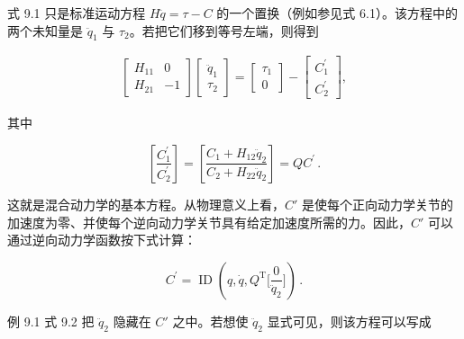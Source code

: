 \documentclass[10pt,a4paper]{book}
\theoremstyle{thmstyle} %
\theoremstyle{defstyle} %
\theoremstyle{prostyle} %
\begin{document}
式 9.1 只是标准运动方程 $H\ddot{q}=\tau-C$ 的一个置换（例如参见式 6.1）。该方程中的两个未知量是 $\ddot{q}_1$ 与 $\tau_2$。若把它们移到等号左端，则得到



$$
\begin{array}{r} { \left[ \begin{array}{ll} { H _ { 11 } } & { 0 } \\{ H _ { 21 } } & { - 1 } \end{array} \right] \left[ \begin{array}{l} { \ddot { q } _ { 1 } } \\{ \tau _ { 2 } } \end{array} \right] = \left[ \begin{array}{l} { \tau _ { 1 } } \\{ 0 } \end{array} \right] - \left[ \begin{array}{l} { C _ { 1 } ^{\prime} } \\{ C _ { 2 } ^{\prime} } \end{array} \right] , } \end{array}
$$



其中



$$
\left[ \frac { C _ { 1 } ^{\prime} } { C _ { 2 } ^{\prime} } \right] = \left[ \frac { C _ { 1 } + H _ { 12 } \ddot { q } _ { 2 } } { C _ { 2 } + H _ { 22 } \ddot { q } _ { 2 } } \right] = Q C ^{\prime} \, .
$$



这就是混合动力学的基本方程。从物理意义上看，$C'$ 是使每个正向动力学关节的加速度为零、并使每个逆向动力学关节具有给定加速度所需的力。因此，$C'$ 可以通过逆向动力学函数按下式计算：



$$
C ^{\prime} = \operatorname { I D } ( q , \dot { q } , Q ^{\mathrm { T} } \biggl [ \frac { 0 } { \ddot { q } _ { 2 } } \biggr ] ) \, .
$$



例 9.1 式 9.2 把 $\ddot{q}_{2}$ 隐藏在 $C'$ 之中。若想使 $\ddot{q}_{2}$ 显式可见，则该方程可以写成
\end{document}
